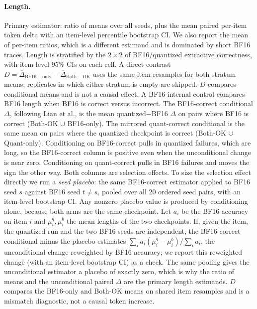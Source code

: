 \documentclass[11pt,a4paper]{article}
\begin{document}
\paragraph{Length.}
Primary estimator: ratio of means over all seeds, plus the mean paired per-item token delta with an item-level percentile bootstrap CI. We also report the mean of per-item ratios, which is a different estimand and is dominated by short BF16 traces. Length is stratified by the $2\times 2$ of BF16/quantized extractive correctness, with item-level 95\% CIs on each cell. A direct contrast $D=\overline{\Delta}_{\mathrm{BF16-only}}-\overline{\Delta}_{\mathrm{Both-OK}}$ uses the same item resamples for both stratum means; replicates in which either stratum is empty are skipped. $D$ compares conditional means and is not a causal effect. A BF16-internal control compares BF16 length when BF16 is correct versus incorrect. The BF16-correct conditional $\Delta$, following Lian et al., is the mean quantized$-$BF16 $\Delta$ on pairs where BF16 is correct (Both-OK $\cup$ BF16-only). The mirrored quant-correct conditional is the same mean on pairs where the quantized checkpoint is correct (Both-OK $\cup$ Quant-only). Conditioning on BF16-correct pulls in quantized failures, which are long, so the BF16-correct column is positive even when the unconditional change is near zero. Conditioning on quant-correct pulls in BF16 failures and moves the sign the other way. Both columns are selection effects. To size the selection effect directly we run a \emph{seed placebo}: the same BF16-correct estimator applied to BF16 seed $s$ against BF16 seed $t\neq s$, pooled over all 20 ordered seed pairs, with an item-level bootstrap CI. Any nonzero placebo value is produced by conditioning alone, because both arms are the same checkpoint. Let $a_i$ be the BF16 accuracy on item $i$ and $\mu^{q}_i,\mu^{b}_i$ the mean lengths of the two checkpoints. If, given the item, the quantized run and the two BF16 seeds are independent, the BF16-correct conditional minus the placebo estimates $\sum_i a_i(\mu^{q}_i-\mu^{b}_i)/\sum_i a_i$, the unconditional change reweighted by BF16 accuracy; we report this reweighted change (with an item-level bootstrap CI) as a check. The same pooling gives the unconditional estimator a placebo of exactly zero, which is why the ratio of means and the unconditional paired $\Delta$ are the primary length estimands. $D$ compares the BF16-only and Both-OK means on shared item resamples and is a mismatch diagnostic, not a causal token increase.
\end{document}

